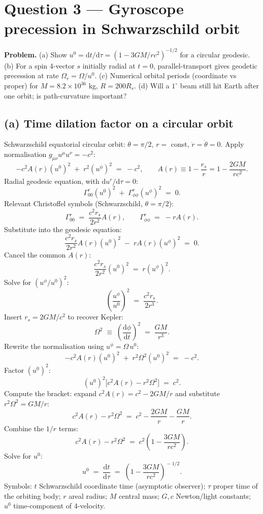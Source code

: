 \documentclass[11pt]{article}
\newcommand{\de}{\mathrm{d}}
\begin{document}
\section*{Question 3 --- Gyroscope precession in Schwarzschild orbit}

\textbf{Problem.} (a) Show $u^0=\de t/\de\tau=(1-3GM/rc^2)^{-1/2}$ for a circular geodesic. (b) For a spin 4-vector $s$ initially radial at $t=0$, parallel-transport gives geodetic precession at rate $\Omega_r=\Omega/u^0$. (c) Numerical orbital periods (coordinate vs proper) for $M=8.2\times 10^{36}$ kg, $R=200 R_s$. (d) Will a $1^\circ$ beam still hit Earth after one orbit; is path-curvature important?

\subsection*{(a) Time dilation factor on a circular orbit}

Schwarzschild equatorial circular orbit: $\theta=\pi/2$, $r=$ const, $\dot r=\dot\theta=0$. Apply normalisation $g_{\mu\nu}u^\mu u^\nu = -c^2$:
\[
-c^2 A(r)(u^0)^2 \;+\; r^2(u^\phi)^2 \;=\; -c^2,\qquad A(r)\equiv 1-\frac{r_s}{r}=1-\frac{2GM}{rc^2}.
\]
Radial geodesic equation, with $\de u^r/\de\tau=0$:
\[
\Gamma^{r}_{00}(u^0)^2 \;+\; \Gamma^{r}_{\phi\phi}(u^\phi)^2 \;=\; 0.
\]
Relevant Christoffel symbols (Schwarzschild, $\theta=\pi/2$):
\[
\Gamma^{r}_{00} \;=\; \frac{c^2 r_s}{2 r^2}A(r),\qquad \Gamma^{r}_{\phi\phi} \;=\; -r A(r).
\]
Substitute into the geodesic equation:
\[
\frac{c^2 r_s}{2 r^2}A(r)(u^0)^2 \;-\; r A(r)(u^\phi)^2 \;=\; 0.
\]
Cancel the common $A(r)$:
\[
\frac{c^2 r_s}{2 r^2}(u^0)^2 \;=\; r(u^\phi)^2.
\]
Solve for $(u^\phi/u^0)^2$:
\[
\!\left(\frac{u^\phi}{u^0}\right)^{2} \;=\; \frac{c^2 r_s}{2 r^3}.
\]
Insert $r_s=2GM/c^2$ to recover Kepler:
\begin{equation}
\Omega^2 \;\equiv\; \!\left(\frac{\de\phi}{\de t}\right)^{2} \;=\; \frac{GM}{r^3}.
\label{eq:kepler}
\end{equation}
Rewrite the normalisation using $u^\phi = \Omega\,u^0$:
\[
-c^2 A(r)(u^0)^2 \;+\; r^2\Omega^2 (u^0)^2 \;=\; -c^2.
\]
Factor $(u^0)^2$:
\[
(u^0)^2\bigl[c^2 A(r) - r^2\Omega^2\bigr] \;=\; c^2.
\]
Compute the bracket: expand $c^2 A(r)=c^2-2GM/r$ and substitute $r^2\Omega^2=GM/r$:
\[
c^2 A(r) - r^2\Omega^2 \;=\; c^2 - \frac{2GM}{r} - \frac{GM}{r}.
\]
Combine the $1/r$ terms:
\[
c^2 A(r) - r^2\Omega^2 \;=\; c^2\!\left(1 - \frac{3GM}{rc^2}\right).
\]
Solve for $u^0$:
\begin{equation}
\boxed{\;u^0 \;=\; \frac{\de t}{\de\tau} \;=\; \!\left(1-\frac{3GM}{rc^2}\right)^{\!-1/2}.\;}
\label{eq:u0}
\end{equation}
Symbols: $t$ Schwarzschild coordinate time (asymptotic observer); $\tau$ proper time of the orbiting body; $r$ areal radius; $M$ central mass; $G,c$ Newton/light constants; $u^0$ time-component of 4-velocity.
\end{document}
